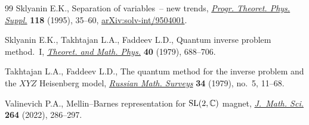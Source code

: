 \documentclass[10pt,a4paper]{amsart}
\numberwithin{equation}{section}
\begin{document}
\begin{thebibliography}{99}
Sklyanin E.K., Separation of variables~-- new trends,
 \href{https://doi.org/10.1143/PTPS.118.35}{\textit{Progr. Theoret. Phys.
 Suppl.}} \textbf{118} (1995), 35--60,
 \href{http://arxiv.org/abs/solv-int/9504001}{arXiv:solv-int/9504001}.

Sklyanin E.K., Takhtajan L.A., Faddeev L.D., Quantum inverse problem
 method.~{I}, \href{https://doi.org/10.1007/BF01018718}{\textit{Theoret. and
 Math. Phys.}} \textbf{40} (1979), 688--706.

Takhtajan L.A., Faddeev L.D., The quantum method for the inverse problem and
 the {$XYZ$} {H}eisenberg model,
 \href{https://doi.org/10.1070/RM1979v034n05ABEH003909}{\textit{Russian Math.
 Surveys}} \textbf{34} (1979), no.~5, 11--68.

Valinevich P.A., Mellin--{B}arnes representation for {${\rm SL}(2,\mathbb{C})$}
 magnet, \href{https://doi.org/10.1007/s10958-022-05999-2}{\textit{J.~Math.
 Sci.}} \textbf{264} (2022), 286--297.

\end{thebibliography}
\end{document}
